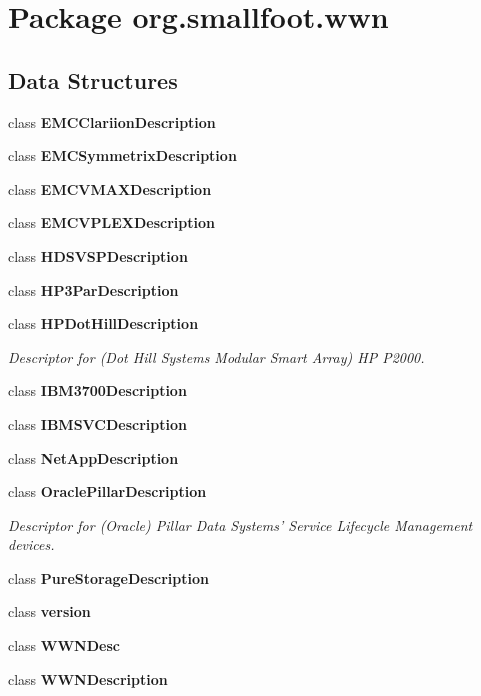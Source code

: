 \section{\-Package org.\-smallfoot.\-wwn}
\label{namespaceorg_1_1smallfoot_1_1wwn}
\subsection*{\-Data \-Structures}
\begin{DoxyCompactItemize}
\item 
class {\bf \-E\-M\-C\-Clariion\-Description}
\item 
class {\bf \-E\-M\-C\-Symmetrix\-Description}
\item 
class {\bf \-E\-M\-C\-V\-M\-A\-X\-Description}
\item 
class {\bf \-E\-M\-C\-V\-P\-L\-E\-X\-Description}
\item 
class {\bf \-H\-D\-S\-V\-S\-P\-Description}
\item 
class {\bf \-H\-P3\-Par\-Description}
\item 
class {\bf \-H\-P\-Dot\-Hill\-Description}
\begin{DoxyCompactList}\small\item\em \-Descriptor for (\-Dot \-Hill \-Systems \-Modular \-Smart \-Array) \-H\-P \-P2000. \end{DoxyCompactList}\item 
class {\bf \-I\-B\-M3700\-Description}
\item 
class {\bf \-I\-B\-M\-S\-V\-C\-Description}
\item 
class {\bf \-Net\-App\-Description}
\item 
class {\bf \-Oracle\-Pillar\-Description}
\begin{DoxyCompactList}\small\item\em \-Descriptor for (\-Oracle) \-Pillar \-Data \-Systems' \-Service \-Lifecycle \-Management devices. \end{DoxyCompactList}\item 
class {\bf \-Pure\-Storage\-Description}
\item 
class {\bf version}
\item 
class {\bf \-W\-W\-N\-Desc}
\item 
class {\bf \-W\-W\-N\-Description}
\end{DoxyCompactItemize}
